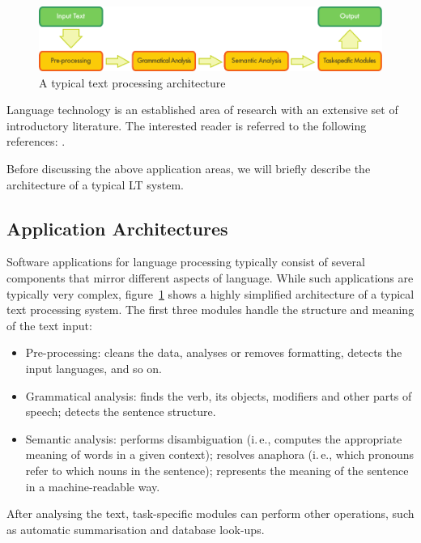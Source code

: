 \documentclass{../../metanetpaper}
\begin{document}
\begin{multicols}{2}
\begin{figure}[b]
  \center
  \includegraphics[width=\textwidth]{../_media/english/text_processing_app_architecture}
  \caption{A typical text processing architecture}
  \label{fig:textprocessingarch_en}
\end{figure}

Language technology is an established area of research with an extensive set of introductory literature. The interested reader is referred to the following references:  \cite{carstensen-etal1, jurafsky-martin01, manning-schuetze1, lt-world1, lt-survey1}.

Before discussing the above application areas, we will briefly describe the architecture of a typical LT system.

\subsection{Application Architectures}

Software applications for language processing typically consist of several components that mirror different aspects of language. While such applications are typically very complex, figure~\ref{fig:textprocessingarch_en} shows a highly simplified architecture of a typical text processing system. The first three modules handle the structure and meaning of the text input:

\begin{itemize}
\item Pre-processing: cleans the data, analyses or removes formatting, detects the input languages, and so on.
\item Grammatical analysis: finds the verb, its objects, modifiers and other parts of speech; detects the sentence structure.
\item Semantic analysis: performs disambiguation (i.\,e., computes the appropriate meaning of words in a given context); resolves anaphora (i.\,e., which pronouns refer to which nouns in the sentence); represents the meaning of the sentence in a machine-readable way.
\end{itemize}

After analysing the text, task-specific modules can perform other operations, such as automatic summarisation and database look-ups.


\end{multicols}
\end{document}
